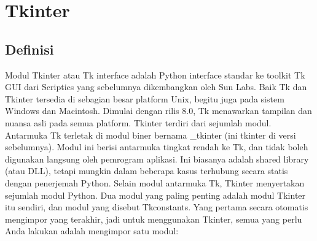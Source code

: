 \section {Tkinter}

\subsection{Definisi}
\cite{lundh1999introduction} Modul Tkinter atau Tk interface adalah Python interface standar ke toolkit Tk GUI dari Scriptics yang sebelumnya dikembangkan oleh Sun Labs. Baik Tk dan Tkinter tersedia di sebagian besar platform Unix, begitu juga pada sistem Windows dan Macintosh. Dimulai dengan rilis 8.0, Tk menawarkan tampilan dan nuansa asli pada semua platform. Tkinter terdiri dari sejumlah modul. Antarmuka Tk terletak di modul biner bernama _tkinter (ini tkinter di versi sebelumnya). Modul ini berisi antarmuka tingkat rendah ke Tk, dan tidak boleh digunakan langsung oleh pemrogram aplikasi. Ini biasanya adalah shared library (atau DLL), tetapi mungkin dalam beberapa kasus terhubung secara statis dengan penerjemah Python. Selain modul antarmuka Tk, Tkinter menyertakan sejumlah modul Python. Dua modul yang paling penting adalah modul Tkinter itu sendiri, dan modul yang disebut Tkconstants. Yang pertama secara otomatis mengimpor yang terakhir, jadi untuk menggunakan Tkinter, semua yang perlu Anda lakukan adalah mengimpor satu modul: 

